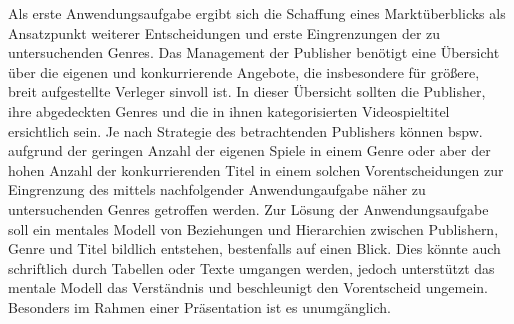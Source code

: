 \documentclass[usegeometry=true]{scrartcl}
\begin{document}
Als erste Anwendungsaufgabe ergibt sich die Schaffung eines Marktüberblicks als Ansatzpunkt weiterer Entscheidungen und erste Eingrenzungen der zu untersuchenden Genres. 
Das Management der Publisher benötigt eine Übersicht über die eigenen und konkurrierende Angebote, die insbesondere für größere, breit aufgestellte Verleger sinvoll ist.
In dieser Übersicht sollten die Publisher, ihre abgedeckten Genres und die in ihnen kategorisierten Videospieltitel ersichtlich sein. 
Je nach Strategie des betrachtenden Publishers können bspw. aufgrund der geringen Anzahl der eigenen Spiele in einem Genre oder aber der hohen Anzahl der konkurrierenden Titel in einem solchen Vorentscheidungen zur Eingrenzung des mittels nachfolgender Anwendungaufgabe näher zu untersuchenden Genres getroffen werden. 
Zur Lösung der Anwendungsaufgabe soll ein mentales Modell von Beziehungen und Hierarchien zwischen Publishern, Genre und Titel bildlich entstehen, bestenfalls auf einen Blick.
Dies könnte auch schriftlich durch Tabellen oder Texte umgangen werden, jedoch unterstützt das mentale Modell das Verständnis und beschleunigt den Vorentscheid ungemein. 
Besonders im Rahmen einer Präsentation ist es unumgänglich.
\end{document}
